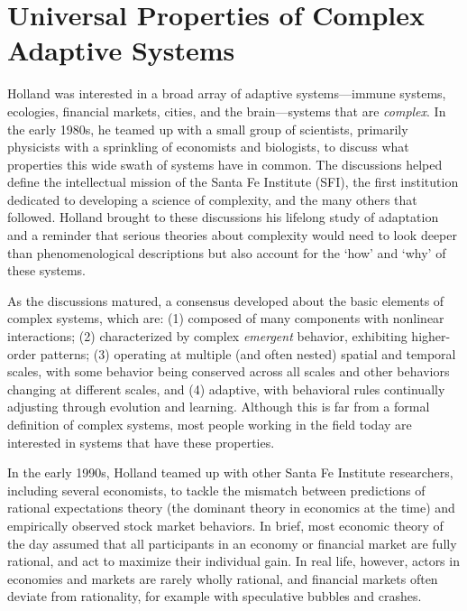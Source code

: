 \documentclass{sig-alternate}
\begin{document}
\section{Universal Properties of Complex Adaptive Systems}

Holland was interested in a broad array of adaptive systems---immune
systems, ecologies, financial markets, cities, and the brain---systems
that are \emph{complex}.  In the early 1980s, he teamed up with a small
group of scientists, primarily physicists with a sprinkling of
economists and biologists, to discuss what properties this wide swath of systems
have in common.  The discussions helped define the intellectual mission
of the Santa Fe Institute (SFI), the first institution dedicated to
developing a science of complexity, and the many others that followed.
Holland brought to these discussions his lifelong study of
adaptation and a reminder that serious theories about complexity would
need to look deeper than phenomenological descriptions but also
account for the `how' and `why' of these systems.

As the discussions matured, a consensus developed about the basic
elements of complex systems, which are: (1) 
composed of many
components with nonlinear interactions; (2) 
characterized by complex \emph{emergent} behavior, exhibiting
higher-order patterns; (3) 
operating at multiple (and often
nested) spatial and temporal scales, with some behavior being
conserved across all scales and other behaviors changing at different
scales, and (4) 
adaptive, with 
behavioral rules continually adjusting through evolution and learning.  Although this
is far from a formal definition of complex systems, most people
working in the field today are interested in systems that have these
properties.


In the early 1990s, Holland teamed up with other Santa Fe Institute researchers,
including several economists, to tackle the mismatch between predictions
of rational expectations theory (the dominant theory in economics at the time) 
and empirically observed stock market behaviors. 
In brief, most
economic theory of the day assumed that all participants in an economy
or financial market are fully rational, and act to maximize their
individual gain.  In real life, however, actors in economies
and markets are rarely wholly rational, and financial markets often deviate
from rationality, for example with speculative bubbles and crashes.
\end{document}
